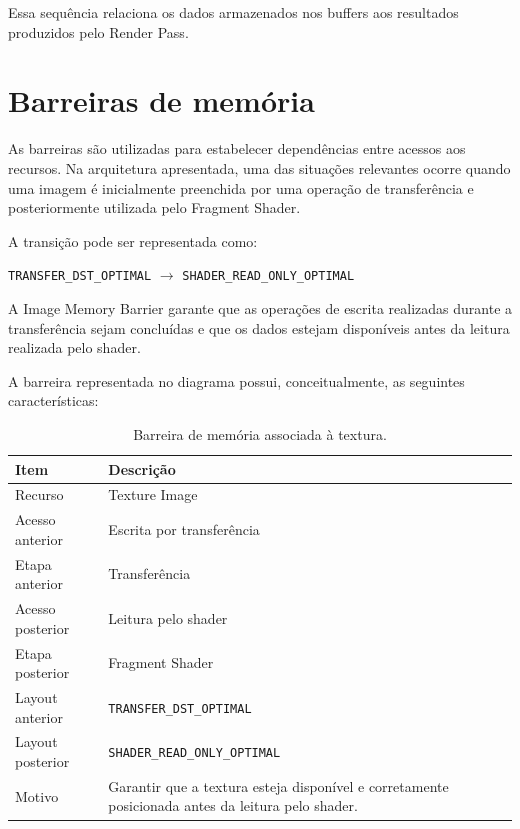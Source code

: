 Essa sequência relaciona os dados armazenados nos buffers aos resultados
produzidos pelo Render Pass.

\section{Barreiras de memória}

As barreiras são utilizadas para estabelecer dependências entre acessos aos
recursos. Na arquitetura apresentada, uma das situações relevantes ocorre
quando uma imagem é inicialmente preenchida por uma operação de
transferência e posteriormente utilizada pelo Fragment Shader.

A transição pode ser representada como:

\begin{center}
\texttt{TRANSFER\_DST\_OPTIMAL}
$\rightarrow$
\texttt{SHADER\_READ\_ONLY\_OPTIMAL}
\end{center}

A Image Memory Barrier garante que as operações de escrita realizadas
durante a transferência sejam concluídas e que os dados estejam disponíveis
antes da leitura realizada pelo shader.

A barreira representada no diagrama possui, conceitualmente, as seguintes
características:

\begin{table}[H]
    \centering
    \caption{Barreira de memória associada à textura.}
    \label{tab:image-barrier}
    \begin{tabular}{p{} p{}}
        \toprule
        \textbf{Item} & \textbf{Descrição} \\
        \midrule
        Recurso & Texture Image \\
        Acesso anterior & Escrita por transferência \\
        Etapa anterior & Transferência \\
        Acesso posterior & Leitura pelo shader \\
        Etapa posterior & Fragment Shader \\
        Layout anterior & \texttt{TRANSFER\_DST\_OPTIMAL} \\
        Layout posterior & \texttt{SHADER\_READ\_ONLY\_OPTIMAL} \\
        Motivo & Garantir que a textura esteja disponível e corretamente
        posicionada antes da leitura pelo shader. \\
        \bottomrule
    \end{tabular}
\end{table}

